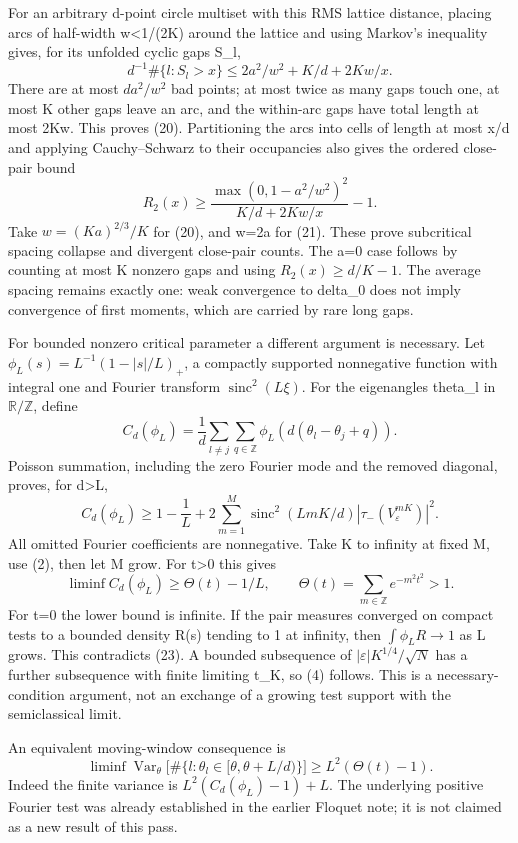 \documentclass[11pt,a4paper]{article}
\begin{document}
For an arbitrary d-point circle multiset with this RMS lattice distance, placing arcs of half-width w\textless1/(2K) around the lattice and using Markov's inequality gives, for its unfolded cyclic gaps S\_l, \[
 d^{-1}\#\{l:S_l>x\}\leq2a^2/w^2+K/d+2Kw/x.                  \tag{20}
\] There are at most \(da^2/w^2\) bad points; at most twice as many gaps touch one, at most K other gaps leave an arc, and the within-arc gaps have total length at most 2Kw. This proves (20). Partitioning the arcs into cells of length at most x/d and applying Cauchy--Schwarz to their occupancies also gives the ordered close-pair bound \[
 R_2(x)\geq\frac{\max(0,1-a^2/w^2)^2}{K/d+2Kw/x}-1.           \tag{21}
\] Take \(w=(Ka)^{2/3}/K\) for (20), and w=2a for (21). These prove subcritical spacing collapse and divergent close-pair counts. The a=0 case follows by counting at most K nonzero gaps and using \(R_2(x)\geq d/K-1\). The average spacing remains exactly one: weak convergence to delta\_0 does not imply convergence of first moments, which are carried by rare long gaps.

For bounded nonzero critical parameter a different argument is necessary. Let \(\phi_L(s)=L^{-1}(1-|s|/L)_+\), a compactly supported nonnegative function with integral one and Fourier transform \(\operatorname{sinc}^2(L\xi)\). For the eigenangles theta\_l in \(\mathbb R/\mathbb Z\), define \[
 C_d(\phi_L)=\frac1d\sum_{l\ne j}\sum_{q\in\mathbb Z}
                       \phi_L(d(\theta_l-\theta_j+q)).
\] Poisson summation, including the zero Fourier mode and the removed diagonal, proves, for d\textgreater L, \[
 C_d(\phi_L)\geq1-\frac1L+
       2\sum_{m=1}^{M}\operatorname{sinc}^2(LmK/d)
                                 |\tau_-(V_\varepsilon^{mK})|^2. \tag{22}
\] All omitted Fourier coefficients are nonnegative. Take K to infinity at fixed M, use (2), then let M grow. For t\textgreater0 this gives \[
 \liminf C_d(\phi_L)\geq\Theta(t)-1/L,\qquad
 \Theta(t)=\sum_{m\in\mathbb Z}e^{-m^2t^2}>1.                  \tag{23}
\] For t=0 the lower bound is infinite. If the pair measures converged on compact tests to a bounded density R(s) tending to 1 at infinity, then \(\int\phi_LR\to1\) as L grows. This contradicts (23). A bounded subsequence of \(|\varepsilon|K^{1/4}/\sqrt N\) has a further subsequence with finite limiting t\_K, so (4) follows. This is a necessary-condition argument, not an exchange of a growing test support with the semiclassical limit.

An equivalent moving-window consequence is \[
 \liminf\operatorname{Var}_{\theta}\!\bigl[
      \#\{l:\theta_l\in[\theta,\theta+L/d)\}\bigr]
       \geq L^2(\Theta(t)-1).
\] Indeed the finite variance is \(L^2(C_d(\phi_L)-1)+L\). The underlying positive Fourier test was already established in the earlier Floquet note; it is not claimed as a new result of this pass.
\end{document}
